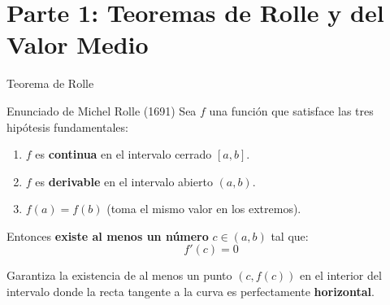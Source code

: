 \documentclass[aspectratio=169]{beamer}
\begin{document}
\begin{frame}[plain]
  \titlepage
\end{frame}

\section{Parte 1: Teoremas de Rolle y del Valor Medio}


\begin{frame}{Teorema de Rolle}
  \begin{block}{Enunciado de Michel Rolle (1691)}
    Sea $f$ una función que satisface las tres hipótesis fundamentales:
    \begin{enumerate}
      \item $f$ es \textbf{continua} en el intervalo cerrado $[a, b]$.
      \item $f$ es \textbf{derivable} en el intervalo abierto $(a, b)$.
      \item $f(a) = f(b)$ (toma el mismo valor en los extremos).
    \end{enumerate}
    Entonces \textbf{existe al menos un número} $c \in (a, b)$ tal que:
    $$\boxed{f'(c) = 0}$$
  \end{block}

  \vspace{4pt}
  \begin{mwextra}
    Garantiza la existencia de al menos un punto $(c, f(c))$ en el interior del intervalo donde la recta tangente a la curva es perfectamente \textbf{horizontal}.
  \end{mwextra}
\end{frame}
\end{document}
